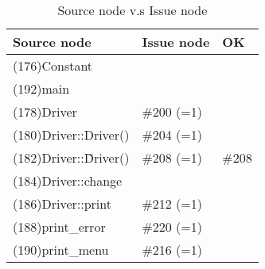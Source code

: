 \begin{table}[hb]
\begin{center}
\begin{tabular}{|l|l|l|}
\hline
Source node & Issue node & OK\\
\hline
(176)Constant & & \\
(192)main & & \\
(178)Driver & \#200 (=1)& \\
(180)Driver::Driver() & \#204 (=1)& \\
(182)Driver::\~Driver() & \#208 (=1) & \#208 \\
(184)Driver::change & & \\
(186)Driver::print & \#212 (=1)& \\
(188)print\_error & \#220 (=1)& \\
(190)print\_menu & \#216 (=1)& \\
\hline
\end{tabular}
\caption{Source node v.s Issue node}
\end{center}
\end{table}


